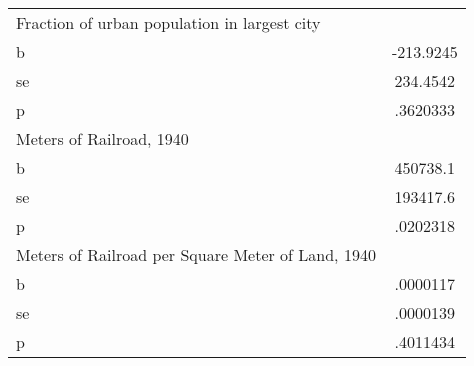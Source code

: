 \begin{tabular}{l*{1}{c}}
\midrule
Fraction of urban population in largest city&         \\
b               &-213.9245\\
se              & 234.4542\\
p               & .3620333\\
\midrule
Meters of Railroad, 1940&         \\
b               & 450738.1\\
se              & 193417.6\\
p               & .0202318\\
\midrule
Meters of Railroad per Square Meter of Land, 1940&         \\
b               & .0000117\\
se              & .0000139\\
p               & .4011434\\
\bottomrule
\end{tabular}

